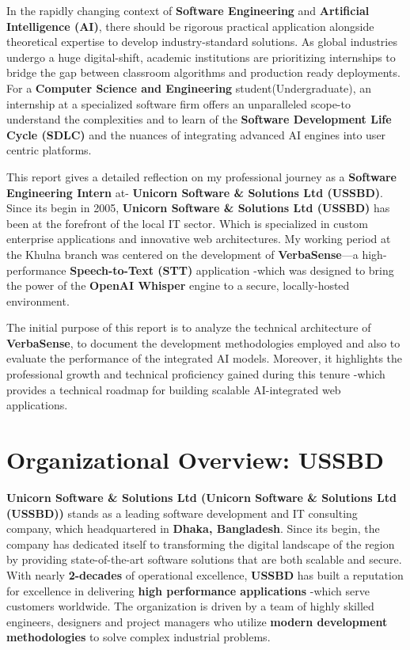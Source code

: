 \documentclass[oneside]{thesis-library}
\begin{document}
In the rapidly changing context of \textbf{Software Engineering} and \textbf{Artificial Intelligence (AI)}, there should be rigorous practical application alongside theoretical expertise to develop industry-standard solutions. As global industries undergo a huge digital-shift, academic institutions are prioritizing internships to bridge the gap between classroom algorithms and production ready deployments. For a \textbf{Computer Science and Engineering} student(Undergraduate), an internship at a specialized software firm offers an unparalleled scope-to understand the complexities and to learn of the \textbf{Software Development Life Cycle (SDLC)} and the nuances of integrating advanced AI engines into user centric platforms.

This report gives a detailed reflection on my professional journey as a \textbf{Software Engineering Intern} at- \textbf{Unicorn Software \& Solutions Ltd (USSBD)}. Since its begin in 2005, \textbf{Unicorn Software \& Solutions Ltd (USSBD)} has been at the forefront of the local IT sector. Which is specialized in custom enterprise applications and innovative web architectures. My working period at the Khulna branch was centered on the development of \textbf{VerbaSense}---a high-performance \textbf{Speech-to-Text (STT)} application -which was designed to bring the power of the \textbf{OpenAI Whisper} engine to a secure, locally-hosted environment.

The initial purpose of this report is to analyze the technical architecture of \textbf{VerbaSense}, to document the development methodologies employed and also to evaluate the performance of the integrated AI models. Moreover, it highlights the professional growth and technical proficiency gained during this tenure -which provides a technical roadmap for building scalable AI-integrated web applications.

\section{Organizational Overview: USSBD}
\textbf{Unicorn Software \& Solutions Ltd (Unicorn Software \& Solutions Ltd (USSBD))} stands as a leading software development and IT consulting company, which headquartered in \textbf{Dhaka, Bangladesh}. Since its begin, the company has dedicated itself to transforming the digital landscape of the region by providing state-of-the-art software solutions that are both scalable and secure. With nearly \textbf{2-decades} of operational excellence, \textbf{USSBD} has built a reputation for excellence in delivering \textbf{high performance applications} -which serve customers worldwide. The organization is driven by a team of highly skilled engineers, designers and project managers who utilize \textbf{modern development methodologies} to solve complex industrial problems.
\end{document}
